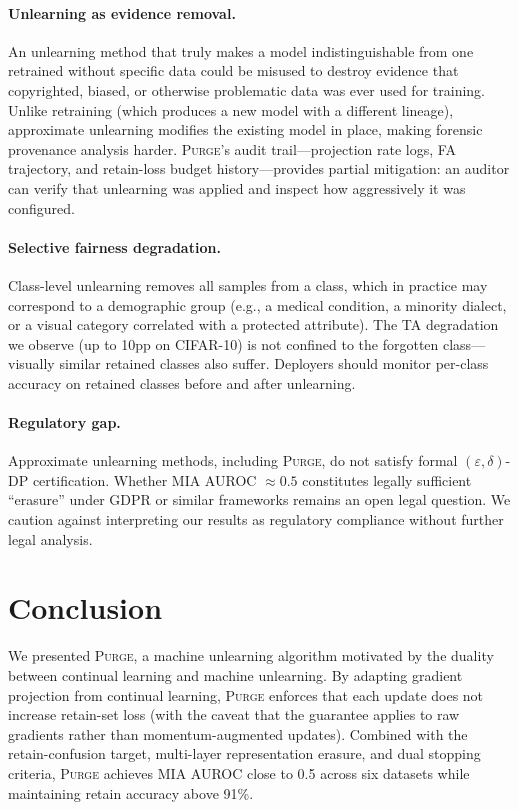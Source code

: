 \documentclass{article}
\newcommand{\ours}{\textsc{Purge}}
\newcommand{\new}[1]{{\color{orange}#1}}
\begin{document}
\paragraph{Unlearning as evidence removal.}
An unlearning method that truly makes a model indistinguishable from one retrained without specific data could be misused to destroy evidence that copyrighted, biased, or otherwise problematic data was ever used for training.
Unlike retraining (which produces a new model with a different lineage), approximate unlearning modifies the existing model in place, making forensic provenance analysis harder.
\ours{}'s audit trail---projection rate logs, FA trajectory, and retain-loss budget history---provides partial mitigation: an auditor can verify that unlearning was applied and inspect how aggressively it was configured.

\paragraph{Selective fairness degradation.}
Class-level unlearning removes all samples from a class, which in practice may correspond to a demographic group (e.g., a medical condition, a minority dialect, or a visual category correlated with a protected attribute).
The TA degradation we observe (up to 10pp on CIFAR-10) is not confined to the forgotten class---visually similar retained classes also suffer.
Deployers should monitor per-class accuracy on retained classes before and after unlearning.

\paragraph{Regulatory gap.}
Approximate unlearning methods, including \ours{}, do not satisfy formal $(\varepsilon, \delta)$-DP certification.
Whether MIA AUROC $\approx 0.5$ constitutes legally sufficient ``erasure'' under GDPR or similar frameworks remains an open legal question.
We caution against interpreting our results as regulatory compliance without further legal analysis.

\FloatBarrier
\section{Conclusion}\label{sec:conclusion}

We presented \ours{}, a machine unlearning algorithm motivated by the duality between continual learning and machine unlearning.
By adapting gradient projection from continual learning, \ours{} enforces that each update does not increase retain-set loss (with the caveat that the guarantee applies to raw gradients rather than momentum-augmented updates).
Combined with the retain-confusion target, multi-layer representation erasure, and dual stopping criteria, \ours{} achieves MIA AUROC close to 0.5 across \new{six} datasets while maintaining retain accuracy above \new{91}\%.
\end{document}
